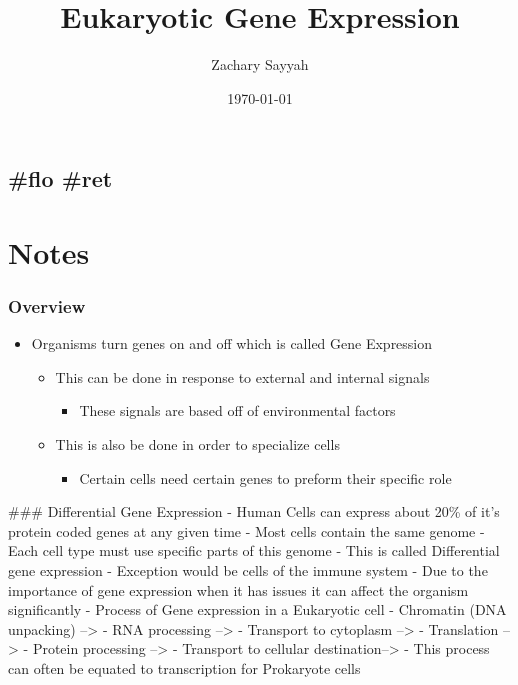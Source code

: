\documentclass[letterpaper]{article}
\author{Zachary Sayyah}
\date{\today}
\title{Eukaryotic Gene Expression}
\renewcommand\maketitle{}
\begin{document}
\maketitle


\subsection{\#flo \#ret}
\label{sec:org77a2e2e}
\section{Notes}
\label{sec:org7bdfda5}
\subsubsection{Overview}
\label{sec:orgd95e62e}
\begin{itemize}
\item Organisms turn genes on and off which is called Gene Expression

\begin{itemize}
\item This can be done in response to external and internal signals

\begin{itemize}
\item These signals are based off of environmental factors
\end{itemize}

\item This is also be done in order to specialize cells

\begin{itemize}
\item Certain cells need certain genes to preform their specific role
\end{itemize}
\end{itemize}
\end{itemize}

\#\#\# Differential Gene Expression - Human Cells can express about 20\% of
it's protein coded genes at any given time - Most cells contain the same
genome - Each cell type must use specific parts of this genome - This is
called Differential gene expression - Exception would be cells of the
immune system - Due to the importance of gene expression when it has
issues it can affect the organism significantly - Process of Gene
expression in a Eukaryotic cell - Chromatin (DNA unpacking) --> - RNA
processing --> - Transport to cytoplasm --> - Translation --> - Protein
processing --> - Transport to cellular destination--> - This process can
often be equated to transcription for Prokaryote cells
\end{document}
